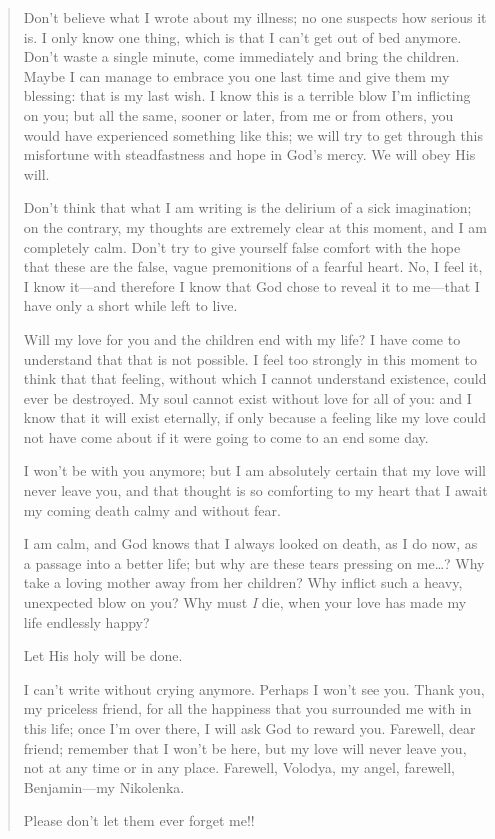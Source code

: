 \begin{quotation}
Don't believe what I wrote about my illness; no one suspects how serious it is. I only know one thing, which is that I can't get out of bed anymore. Don't waste a single minute, come immediately and bring the children. Maybe I can manage to embrace you one last time and give them my blessing: that is my last wish. I know this is a terrible blow I'm inflicting on you; but all the same, sooner or later, from me or from others, you would have experienced something like this; we will try to get through this misfortune with steadfastness and hope in God's mercy. We will obey His will.

Don't think that what I am writing is the delirium of a sick imagination; on the contrary, my thoughts are extremely clear at this moment, and I am completely calm. Don't try to give yourself false comfort with the hope that these are the false, vague premonitions of a fearful heart. No, I feel it, I know it---and therefore I know that God chose to reveal it to me---that I have only a short while left to live.

Will my love for you and the children end with my life? I have come to understand that that is not possible. I feel too strongly in this moment to think that that feeling, without which I cannot understand existence, could ever be destroyed. My soul cannot exist without love for all of you: and I know that it will exist eternally, if only because a feeling like my love could not have come about if it were going to come to an end some day.

I won't be with you anymore; but I am absolutely certain that my love will never leave you, and that thought is so comforting to my heart that I await my coming death calmy and without fear.

I am calm, and God knows that I always looked on death, as I do now, as a passage into a better life; but why are these tears pressing on me\ldots{}? Why take a loving mother away from her children? Why inflict such a heavy, unexpected blow on you? Why must \emph{I} die, when your love has made my life endlessly happy?

Let His holy will be done.

I can't write without crying anymore. Perhaps I won't see you. Thank you, my priceless friend, for all the happiness that you surrounded me with in this life; once I'm over there, I will ask God to reward you. Farewell, dear friend; remember that I won't be here, but my love will never leave you, not at any time or in any place. Farewell, Volodya, my angel, farewell, Benjamin---my Nikolenka.

Please don't let them ever forget me!!
\end{quotation}

